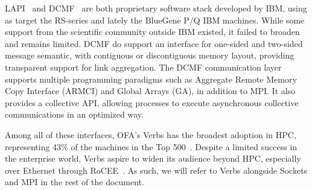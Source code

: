 LAPI~\cite{lapi_a_1998} and DCMF~\cite{Kumar:2008:DCM:1375527.1375544}
are both proprietary software stack developed by IBM, using as target
the RS-series and lately the BlueGene P/Q IBM machines. While some support
from the scientific community outside IBM existed, it failed to
broaden and remains limited. DCMF do support an
interface for one-sided and two-sided message semantic, with
contiguous or discontiguous memory layout, providing transparent support 
for link aggregation. The DCMF communication layer supports 
multiple programming paradigms such as Aggregate Remote Memory Copy Interface 
(ARMCI) and Global Arrays (GA), in addition to MPI. It also provides 
a collective API, allowing processes to execute asynchronous collective
communications in an optimized way.

Among all of these interfaces, OFA's Verbs has the broadest adoption in HPC, 
representing 43\% of the machines in the Top 500~\cite{top500}. Despite 
a limited success in the enterprise world, Verbs aspire to widen its audience 
beyond HPC, especially over Ethernet through RoCEE~\cite{RoCEE}. As such, we 
will refer to Verbs alongside Sockets and MPI in the rest of the document.
